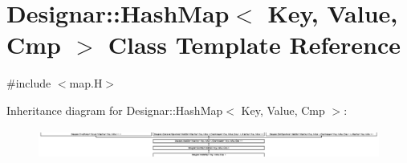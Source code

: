 \hypertarget{class_designar_1_1_hash_map}{}\section{Designar\+:\+:Hash\+Map$<$ Key, Value, Cmp $>$ Class Template Reference}
\label{class_designar_1_1_hash_map}


{\ttfamily \#include $<$map.\+H$>$}

Inheritance diagram for Designar\+:\+:Hash\+Map$<$ Key, Value, Cmp $>$\+:\begin{figure}[H]
\begin{center}
\leavevmode
\includegraphics[height=0.969697cm]{class_designar_1_1_hash_map}
\end{center}
\end{figure}
